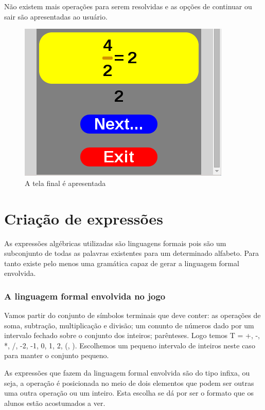 	Não existem mais operações para serem resolvidas e as opções de continuar ou sair são apresentadas ao usuário.
	
\begin{figure}[H]
	\caption{\label{xp_11}A tela final é apresentada}
	\begin{center}
	    \includegraphics[scale=1]{xp_4_11.png}
	\end{center}
\end{figure}

\chapter{Criação de expressões}

As expressões algébricas utilizadas são linguagens formais pois são um subconjunto de todas as palavras existentes para um determinado alfabeto. Para tanto existe pelo menos uma gramática capaz de gerar a linguagem formal envolvida.

\subsection{A linguagem formal envolvida no jogo}
Vamos partir do conjunto de símbolos terminais que deve conter: as operações de soma, subtração, multiplicação e divisão; um conunto de números dado por um intervalo fechado sobre o conjunto dos inteiros; parênteses. Logo temos T = {+, -, *, /, -2, -1, 0, 1, 2, (, )}. Escolhemos um pequeno intervalo de inteiros neste caso para manter o conjunto pequeno.

	As expressões que fazem da linguagem formal envolvida são do tipo infixa, ou seja, a operação é posicionada no meio de dois elementos que podem ser outras uma outra operação ou um inteiro. Esta escolha se dá por ser o formato que os alunos estão acostumados a ver.
	

